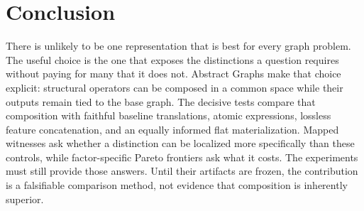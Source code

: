 \section{Conclusion}
\label{sec:conclusion}

There is unlikely to be one representation that is best for every graph
problem. The useful choice is the one that exposes the distinctions a question
requires without paying for many that it does not. Abstract Graphs make that
choice explicit: structural operators can be composed in a common space while
their outputs remain tied to the base graph. The decisive tests compare that
composition with faithful baseline translations, atomic expressions, lossless
feature concatenation, and an equally informed flat materialization. Mapped
witnesses ask whether a distinction can be localized more specifically than
these controls, while factor-specific Pareto frontiers ask what it costs. The
experiments must still provide those answers. Until their artifacts are frozen,
the contribution is a falsifiable comparison method, not evidence that
composition is inherently superior.
